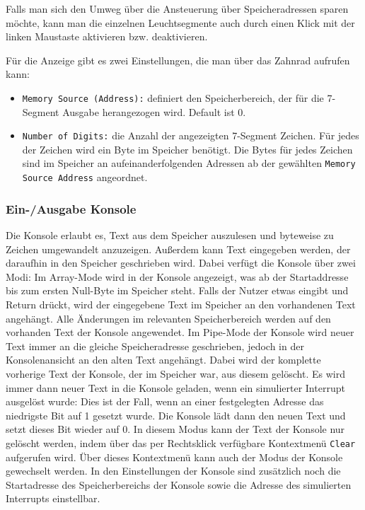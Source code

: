 Falls man sich den Umweg über die Ansteuerung über Speicheradressen sparen
möchte, kann man die einzelnen Leuchtsegmente auch durch einen Klick mit der
linken Maustaste aktivieren bzw. deaktivieren.

Für die Anzeige gibt es zwei Einstellungen, die man über das Zahnrad aufrufen kann:
\begin{itemize}
\item \texttt{Memory Source (Address):} definiert den Speicherbereich, der für die 7-Segment Ausgabe herangezogen wird. Default ist 0.
\item \texttt{Number of Digits:} die Anzahl der angezeigten 7-Segment Zeichen. Für jedes der Zeichen wird ein Byte im Speicher benötigt.
					Die Bytes für jedes Zeichen sind im Speicher an aufeinanderfolgenden Adressen ab der gewählten  \texttt{Memory Source Address} angeordnet.
\end{itemize}



\subsubsection{Ein-/Ausgabe Konsole}

Die Konsole erlaubt es, Text aus dem Speicher auszulesen und byteweise zu
Zeichen umgewandelt anzuzeigen. Außerdem kann Text eingegeben werden, der
daraufhin in den Speicher geschrieben wird. Dabei verfügt die Konsole über zwei
Modi: Im Array-Mode wird in der Konsole angezeigt, was ab der Startaddresse bis
zum ersten Null-Byte im Speicher steht. Falls der Nutzer etwas eingibt und
Return drückt, wird der eingegebene Text im Speicher an den vorhandenen Text
angehängt. Alle Änderungen im relevanten Speicherbereich werden auf den
vorhanden Text der Konsole angewendet. Im Pipe-Mode der Konsole wird neuer Text
immer an die gleiche Speicheradresse geschrieben, jedoch in der Konsolenansicht
an den alten Text angehängt. Dabei wird der komplette vorherige Text der
Konsole, der im Speicher war, aus diesem gelöscht. Es wird immer dann neuer Text
in die Konsole geladen, wenn ein simulierter Interrupt ausgelöst wurde: Dies ist
der Fall, wenn an einer festgelegten Adresse das niedrigste Bit auf 1 gesetzt
wurde. Die Konsole lädt dann den neuen Text und setzt dieses Bit wieder auf 0.
In diesem Modus kann der Text der Konsole nur gelöscht werden, indem über das
per Rechtsklick verfügbare Kontextmenü \texttt{Clear} aufgerufen wird. Über
dieses Kontextmenü kann auch der Modus der Konsole gewechselt werden. In den
Einstellungen der Konsole sind zusätzlich noch die Startadresse des
Speicherbereichs der Konsole sowie die Adresse des simulierten Interrupts
einstellbar.

